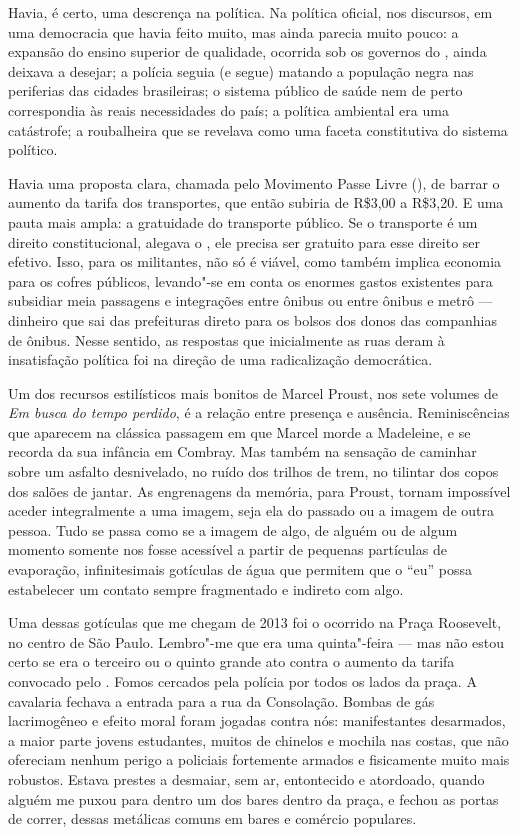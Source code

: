 Havia, é certo, uma descrença na política. Na política oficial, nos
discursos, em uma democracia que havia feito muito, mas ainda parecia
muito pouco: a expansão do ensino superior de qualidade, ocorrida sob os governos do , ainda deixava a desejar; a polícia
seguia (e segue) matando a população negra nas periferias das cidades
brasileiras; o sistema público de saúde nem de perto correspondia às
reais necessidades do país; a política ambiental era uma catástrofe; a
roubalheira que se revelava como uma faceta constitutiva do sistema
político.

Havia uma proposta clara, chamada pelo Movimento Passe Livre
(), de barrar o aumento da tarifa dos transportes, que então subiria
de R\$3,00 a R\$3,20. E uma pauta mais ampla: a gratuidade do transporte
público. Se o transporte é um direito constitucional, alegava o , ele
precisa ser gratuito para esse direito ser efetivo. Isso, para os
militantes, não só é viável, como também implica economia para os cofres
públicos, levando"-se em conta os enormes gastos existentes para
subsidiar meia passagens e integrações entre ônibus ou entre ônibus e
metrô --- dinheiro que sai das prefeituras direto para os bolsos dos
donos das companhias de ônibus. Nesse sentido, as respostas que
inicialmente as ruas deram à insatisfação política foi na direção de uma
radicalização democrática.

Um dos recursos estilísticos mais bonitos de Marcel Proust, nos sete
volumes de \emph{Em busca do tempo perdido}, é a relação entre presença
e ausência. Reminiscências que aparecem na clássica passagem em que
Marcel morde a Madeleine, e se recorda da sua infância em Combray. Mas
também na sensação de caminhar sobre um asfalto desnivelado, no
ruído dos trilhos de trem, no tilintar dos copos dos salões de jantar.
As engrenagens da memória, para Proust, tornam impossível aceder
integralmente a uma imagem, seja ela do passado ou a imagem de outra
pessoa. Tudo se passa como se a imagem de algo, de alguém ou de algum
momento somente nos fosse acessível a partir de pequenas partículas de
evaporação, infinitesimais gotículas de água que permitem que o ``eu''
possa estabelecer um contato sempre fragmentado e indireto com algo.

Uma dessas gotículas que me chegam de 2013 foi o ocorrido na Praça
Roosevelt, no centro de São Paulo. Lembro"-me que era uma quinta"-feira ---
mas não estou certo se era o terceiro ou o quinto grande ato contra o
aumento da tarifa convocado pelo . Fomos cercados pela polícia por
todos os lados da praça. A cavalaria fechava a entrada para a rua da
Consolação. Bombas de gás lacrimogêneo e efeito moral foram jogadas
contra nós: manifestantes desarmados, a maior parte jovens estudantes,
muitos de chinelos e mochila nas costas, que não ofereciam nenhum perigo
a policiais fortemente armados e fisicamente muito mais robustos. Estava
prestes a desmaiar, sem ar, entontecido e atordoado, quando alguém me
puxou para dentro um dos bares dentro da praça, e fechou as portas de
correr, dessas metálicas comuns em bares e comércio populares.

